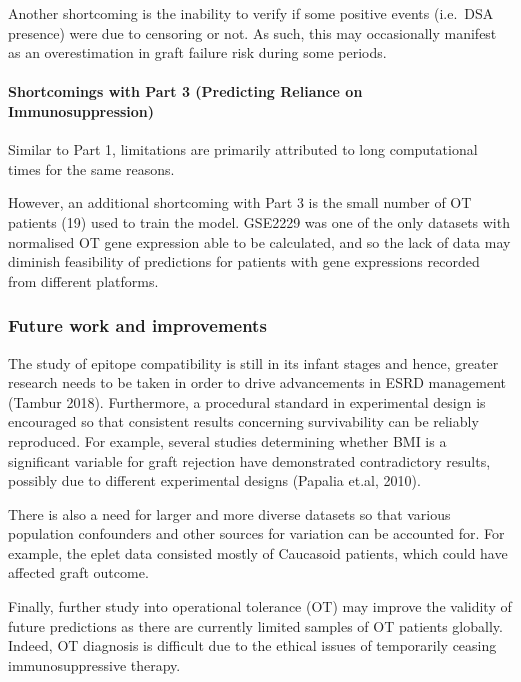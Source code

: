 \documentclass[a4paper,9pt,twocolumn,twoside,]{pinp}
\begin{document}
Another shortcoming is the inability to verify if some positive events
(i.e.~DSA presence) were due to censoring or not. As such, this may
occasionally manifest as an overestimation in graft failure risk during
some periods.

\hypertarget{shortcomings-with-part-3-predicting-reliance-on-immunosuppression}{%
\paragraph{Shortcomings with Part 3 (Predicting Reliance on
Immunosuppression)}\label{shortcomings-with-part-3-predicting-reliance-on-immunosuppression}}

Similar to Part 1, limitations are primarily attributed to long
computational times for the same reasons.

However, an additional shortcoming with Part 3 is the small number of OT
patients (19) used to train the model. GSE2229 was one of the only
datasets with normalised OT gene expression able to be calculated, and
so the lack of data may diminish feasibility of predictions for patients
with gene expressions recorded from different platforms.

\hypertarget{future-work-and-improvements}{%
\subsubsection{Future work and
improvements}\label{future-work-and-improvements}}

The study of epitope compatibility is still in its infant stages and
hence, greater research needs to be taken in order to drive advancements
in ESRD management (Tambur 2018). Furthermore, a procedural standard in
experimental design is encouraged so that consistent results concerning
survivability can be reliably reproduced. For example, several studies
determining whether BMI is a significant variable for graft rejection
have demonstrated contradictory results, possibly due to different
experimental designs (Papalia et.al, 2010).

There is also a need for larger and more diverse datasets so that
various population confounders and other sources for variation can be
accounted for. For example, the eplet data consisted mostly of Caucasoid
patients, which could have affected graft outcome.

Finally, further study into operational tolerance (OT) may improve the
validity of future predictions as there are currently limited samples of
OT patients globally. Indeed, OT diagnosis is difficult due to the
ethical issues of temporarily ceasing immunosuppressive therapy.
\end{document}
